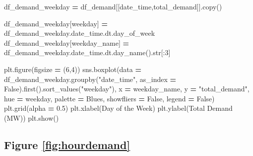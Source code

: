 \documentclass[mstat,12pt]{unswthesis}
\newenvironment{Shaded}{\begin{snugshade}}{\end{snugshade}}
\newcommand{\BuiltInTok}[1]{#1}
\newcommand{\DecValTok}[1]{\textcolor[rgb]{0.00,0.00,0.81}{#1}}
\newcommand{\FloatTok}[1]{\textcolor[rgb]{0.00,0.00,0.81}{#1}}
\newcommand{\NormalTok}[1]{#1}
\newcommand{\OperatorTok}[1]{\textcolor[rgb]{0.81,0.36,0.00}{\textbf{#1}}}
\newcommand{\StringTok}[1]{\textcolor[rgb]{0.31,0.60,0.02}{#1}}
\newcommand{\VariableTok}[1]{\textcolor[rgb]{0.00,0.00,0.00}{#1}}
\begin{document}
\begin{Shaded}
\begin{Highlighting}[]
\NormalTok{df\_demand\_weekday }\OperatorTok{=}\NormalTok{ df\_demand[[}\StringTok{\textquotesingle{}date\_time\textquotesingle{}}\NormalTok{,}\StringTok{\textquotesingle{}total\_demand\textquotesingle{}}\NormalTok{]].copy()}

\NormalTok{df\_demand\_weekday[}\StringTok{\textquotesingle{}weekday\textquotesingle{}}\NormalTok{] }\OperatorTok{=}\NormalTok{ df\_demand\_weekday.date\_time.dt.day\_of\_week}
\NormalTok{df\_demand\_weekday[}\StringTok{\textquotesingle{}weekday\_name\textquotesingle{}}\NormalTok{] }\OperatorTok{=} 
\NormalTok{    df\_demand\_weekday.date\_time.dt.day\_name().}\BuiltInTok{str}\NormalTok{[:}\DecValTok{3}\NormalTok{]}

\NormalTok{plt.figure(figsize }\OperatorTok{=}\NormalTok{ (}\DecValTok{6}\NormalTok{,}\DecValTok{4}\NormalTok{))}
\NormalTok{sns.boxplot(data }\OperatorTok{=}\NormalTok{ df\_demand\_weekday.groupby(}\StringTok{"date\_time"}\NormalTok{, }
\NormalTok{  as\_index }\OperatorTok{=} \VariableTok{False}\NormalTok{).first().sort\_values(}\StringTok{"weekday"}\NormalTok{), }
\NormalTok{  x }\OperatorTok{=} \StringTok{\textquotesingle{}weekday\_name\textquotesingle{}}\NormalTok{, y }\OperatorTok{=} \StringTok{"total\_demand"}\NormalTok{, }
\NormalTok{  hue }\OperatorTok{=} \StringTok{\textquotesingle{}weekday\textquotesingle{}}\NormalTok{, palette }\OperatorTok{=} \StringTok{\textquotesingle{}Blues\textquotesingle{}}\NormalTok{, showfliers }\OperatorTok{=} \VariableTok{False}\NormalTok{, }
\NormalTok{  legend }\OperatorTok{=} \VariableTok{False}\NormalTok{)}
\NormalTok{plt.grid(alpha }\OperatorTok{=} \FloatTok{0.5}\NormalTok{)}
\NormalTok{plt.xlabel(}\StringTok{\textquotesingle{}Day of the Week\textquotesingle{}}\NormalTok{)}
\NormalTok{plt.ylabel(}\StringTok{\textquotesingle{}Total Demand (MW)\textquotesingle{}}\NormalTok{)}
\NormalTok{plt.show()}
\end{Highlighting}
\end{Shaded}

\subsection*{Figure \ref{fig:hourdemand}}\label{figure-reffighourdemand}
\end{document}
